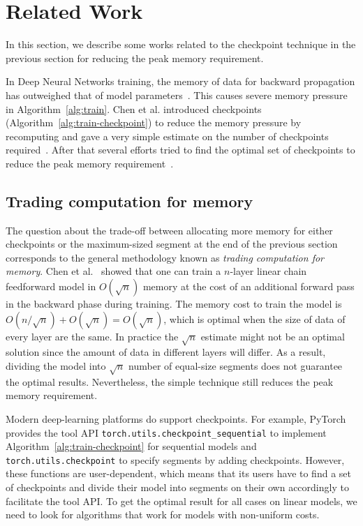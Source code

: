 \section{Related Work}\label{sec:related}

In this section, we describe some works related to the checkpoint technique in the previous section for reducing the peak memory requirement.

In Deep Neural Networks training, the memory of data for backward propagation has outweighed that of model parameters~\cite{sohoni2022lowmemory}. 
This causes severe memory pressure in Algorithm~\ref{alg:train}. 
Chen et al. introduced checkpoints (Algorithm~\ref{alg:train-checkpoint}) to reduce the memory pressure by recomputing and gave a very simple estimate on the number of checkpoints required~\cite{chen2016training}.
After that several efforts tried to find the optimal set of checkpoints to reduce the peak memory requirement~\cite{feng2021optimal}. 

\subsection{Trading computation for memory}

The question about the trade-off between allocating more memory for either checkpoints or the maximum-sized segment at the end of the previous section corresponds to the general methodology known as {\em trading computation for memory}.
Chen et al.~\cite{chen2016training} showed that one can train a $n$-layer linear chain feedforward model in $O(\sqrt{n})$ memory at the cost of an additional forward pass in the backward phase during training.
The memory cost to train the model is $O(n/\sqrt{n})+O(\sqrt{n}) = O(\sqrt{n})$, which is optimal when the size of data of every layer are the same.
In practice the $\sqrt{n}$ estimate might not be an optimal solution since the amount of data in different layers will differ.
As a result, dividing the model into $\sqrt{n}$ number of equal-size segments does not guarantee the optimal results.
Nevertheless, the simple technique still reduces the peak memory requirement.

Modern deep-learning platforms do support checkpoints.
For example, PyTorch~\cite{paszke2019pytorch} provides the tool API \texttt{torch.utils.checkpoint\_sequential} to implement Algorithm~\ref{alg:train-checkpoint} for sequential models and \texttt{torch.utils.checkpoint} to specify segments by adding checkpoints.
However, these functions are user-dependent, which means that its users have to find a set of checkpoints and divide their model into segments on their own accordingly to facilitate the tool API. To get the optimal result for all cases on linear models, we need to look for algorithms that work for models with non-uniform costs.

